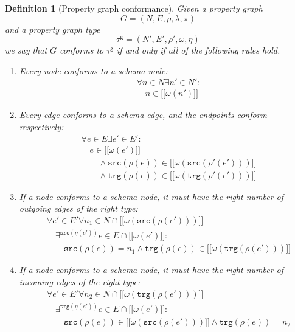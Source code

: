 \documentclass[a4paper]{article}
\newtheorem{definition}[theorem]{Definition}
\newcommand{\src}{\mathtt{src}}
\newcommand{\trg}{\mathtt{trg}}
\newcommand{\gtype}{\tau^\mathsf{g}}
\newcommand{\lsem}{\ensuremath{[\![}}
\newcommand{\rsem}{\ensuremath{]\!]}}
\newcommand{\sem}[1]{\ensuremath{\lsem #1 \rsem}}
\begin{document}
\begin{definition}[Property graph conformance]
  Given a property graph $$G = (N, E, \rho, \lambda, \pi)$$ and a property graph type $$\gtype = (N', E', \rho', \omega, \eta)$$ we say that $G$ \emph{conforms} to $\gtype$ if and only if all of the following rules hold.

  \begin{enumerate}
    \item Every node conforms to a schema node:
    \begin{align*}
      &\forall n \in N \exists n' \in N' :\\
      &\quad n \in \sem{\omega(n')}
    \end{align*}
    
    \item Every edge conforms to a schema edge, and the endpoints conform respectively:
    \begin{align*}
      &\forall e \in E \exists e' \in E' :\\
      &\quad e \in \sem{\omega(e')}\\
      &\quad\quad\wedge \src(\rho(e)) \in \sem{\omega(\src(\rho'(e')))}\\
      &\quad\quad\wedge \trg(\rho(e)) \in \sem{\omega(\trg(\rho'(e')))}
    \end{align*}
    
    \item If a node conforms to a schema node, it must have the right number of outgoing edges of the right type:
    \begin{align*}
      &\forall e' \in E' \forall n_1 \in N \cap \sem{\omega(\src(\rho(e')))}\\
      &\quad\exists^{\src(\eta(e'))} e \in E \cap \sem{\omega(e')} :\\
      &\quad\quad \src(\rho(e)) = n_1 \wedge \trg(\rho(e)) \in \sem{\omega(\trg(\rho(e')))}
    \end{align*}

    \item If a node conforms to a schema node, it must have the right number of incoming edges of the right type:
    \begin{align*}
      &\forall e' \in E' \forall n_2 \in N \cap \sem{\omega(\trg(\rho(e')))}\\
      &\quad\exists^{\trg(\eta(e'))} e \in E \cap \sem{\omega(e')} :\\
      &\quad\quad \src(\rho(e)) \in \sem{\omega(\src(\rho(e')))} \wedge \trg(\rho(e)) = n_2
    \end{align*}
  \end{enumerate}
\end{definition}
\end{document}

